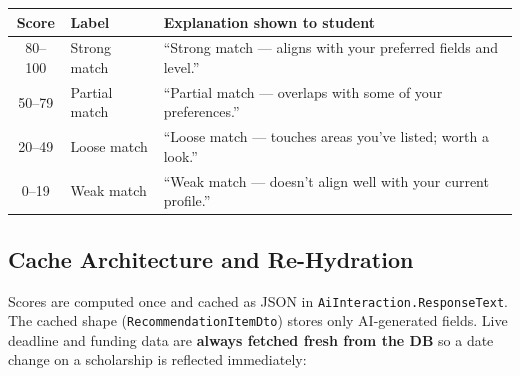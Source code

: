 \documentclass[11pt,a4paper]{article}
\begin{document}
\begin{center}
\begin{tabular}{clp{8cm}}
\toprule
\textbf{Score} & \textbf{Label} & \textbf{Explanation shown to student}\\
\midrule
80--100 & Strong match & ``Strong match --- aligns with your preferred fields and level.''\\
50--79  & Partial match & ``Partial match --- overlaps with some of your preferences.''\\
20--49  & Loose match  & ``Loose match --- touches areas you've listed; worth a look.''\\
0--19   & Weak match   & ``Weak match --- doesn't align well with your current profile.''\\
\bottomrule
\end{tabular}
\end{center}

\subsection{Cache Architecture and Re-Hydration}

Scores are computed once and cached as JSON in \texttt{AiInteraction.ResponseText}.
The cached shape (\texttt{RecommendationItemDto}) stores only AI-generated fields.
Live deadline and funding data are \textbf{always fetched fresh from the DB}
so a date change on a scholarship is reflected immediately:
\end{document}
